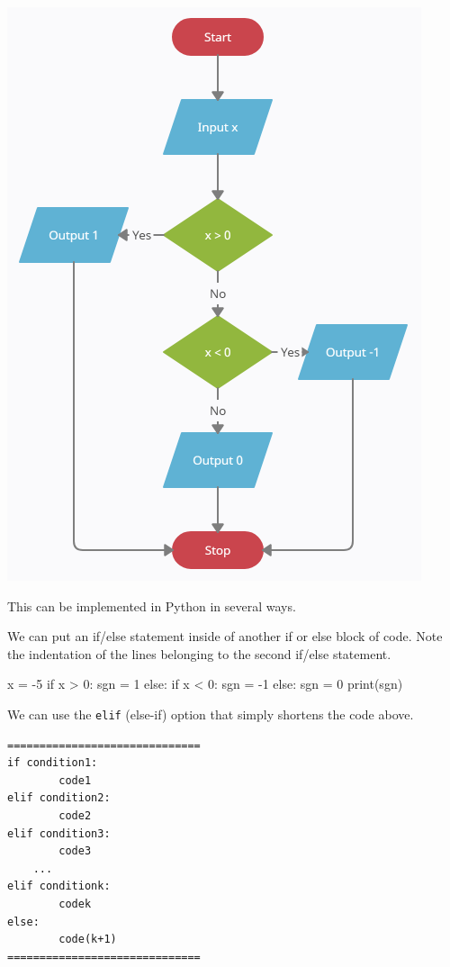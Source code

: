 \documentclass{ximera}
\begin{document}
\begin{center}
	\includegraphics{sgn.png}
\end{center}

This can be implemented in Python in several ways. 

We can put an if/else statement inside of another if or else block of code. Note the indentation of the lines belonging to the second if/else statement.

\begin{sageCell}
x = -5
if x > 0:
	sgn = 1
else:
	if x < 0:
		sgn = -1
	else:
		sgn = 0
print(sgn)
\end{sageCell}
	
We can use the \verb|elif| (else-if) option that simply shortens the code above.

\begin{verbatim}
==============================
if condition1:
        code1
elif condition2:
        code2
elif condition3:
        code3
    ...
elif conditionk:
        codek
else:
        code(k+1)
==============================
\end{verbatim}
\end{document}
